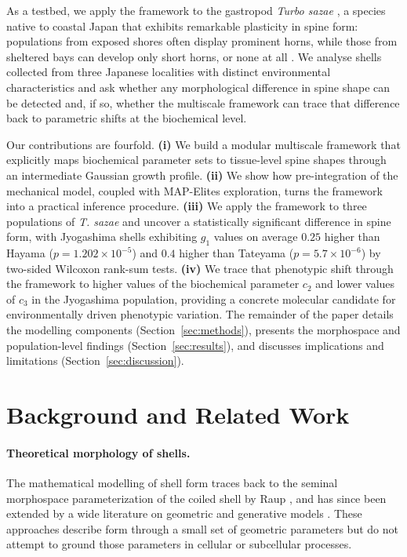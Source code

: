 \documentclass[11pt]{article}
\begin{document}
As a testbed, we apply the framework to the gastropod \textit{Turbo sazae}
\citep{fukuda2017nomenclature}, a species native to coastal Japan that
exhibits remarkable plasticity in spine form: populations from exposed
shores often display prominent horns, while those from sheltered bays can
develop only short horns, or none at all
\citep{tanaka2018phenotypic,hamm2008environmental}. We analyse shells
collected from three Japanese localities with distinct environmental
characteristics and ask whether any morphological difference in spine shape
can be detected and, if so, whether the multiscale framework can trace that
difference back to parametric shifts at the biochemical level.

Our contributions are fourfold. \textbf{(i)} We build a modular multiscale
framework that explicitly maps biochemical parameter sets to tissue-level
spine shapes through an intermediate Gaussian growth profile.
\textbf{(ii)} We show how pre-integration of the mechanical model, coupled
with MAP-Elites exploration, turns the framework into a practical inference
procedure. \textbf{(iii)} We apply the framework to three populations of
\textit{T. sazae} and uncover a statistically significant difference in
spine form, with Jyogashima shells exhibiting $g_1$ values on average
$0.25$ higher than Hayama ($p = 1.202 \times 10^{-5}$) and $0.4$ higher
than Tateyama ($p = 5.7 \times 10^{-6}$) by two-sided Wilcoxon rank-sum
tests. \textbf{(iv)} We trace that phenotypic shift through the framework
to higher values of the biochemical parameter $c_2$ and lower values of
$c_3$ in the Jyogashima population, providing a concrete molecular
candidate for environmentally driven phenotypic variation. The remainder of
the paper details the modelling components (Section~\ref{sec:methods}),
presents the morphospace and population-level findings
(Section~\ref{sec:results}), and discusses implications and limitations
(Section~\ref{sec:discussion}).

\section{Background and Related Work}

\paragraph{Theoretical morphology of shells.} The mathematical modelling of
shell form traces back to the seminal morphospace parameterization of the
coiled shell by Raup \citep{raup1961geometric,raup1966geometric}, and has
since been extended by a wide literature on geometric and generative models
\citep{gerber2017geometry,urdy2011recapitulation,meinhardt1995algorithmic}.
These approaches describe form through a small set of geometric parameters
but do not attempt to ground those parameters in cellular or subcellular
processes.
\end{document}
